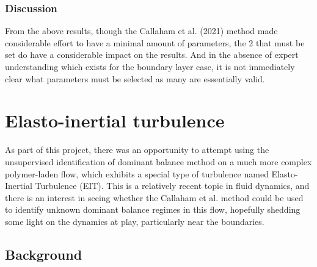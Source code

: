 \documentclass[12pt]{report} %
\begin{document}
\subsection{Discussion}

From the above results, though the Callaham et al. (2021)\cite{callaham2021learning} method made considerable effort to have a minimal amount of parameters, the 2 that must be set do have a considerable impact on the results. And in the absence of expert understanding which exists for the boundary layer case, it is not immediately clear what parameters must be selected as many are essentially valid.




\chapter{Elasto-inertial turbulence}

As part of this project, there was an opportunity to attempt using the unsupervised identification of dominant balance method on a much more complex polymer-laden flow, which exhibits a special type of turbulence named Elasto-Inertial Turbulence (EIT). This is a relatively recent topic in fluid dynamics, and there is an interest in seeing whether the Callaham et al. method could be used to identify unknown dominant balance regimes in this flow, hopefully shedding some light on the dynamics at play, particularly near the boundaries.

\section{Background}
\end{document}
